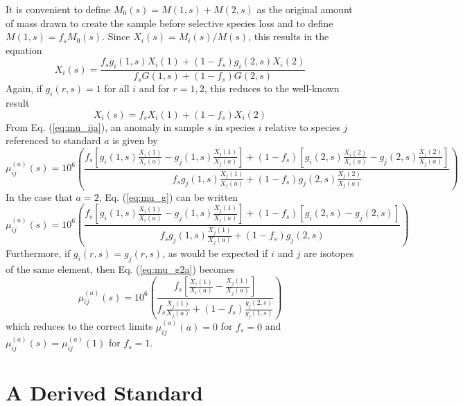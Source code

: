 \documentclass[preprint]{revtex4-2}
\begin{document}
It is convenient to define $M_0(s) = M(1, s) + M(2, s)$ as the original
amount of mass drawn to create the sample before selective species loss and
to define
$M(1, s) = f_s M_0(s)$.  Since
$X_i(s) = M_i(s) / M(s)$, this results in the equation
\begin{equation}
X_i(s) = \frac{f_s g_i(1, s) X_i(1) + \left(1 - f_s\right) g_i(2, s) X_i(2)}{f_s G(1, s) +
\left(1 - f_s\right) G(2, s)}
\label{eq:XG}
\end{equation}
Again, if $g_i(r, s) = 1$ for all $i$ and for $r = 1,2$,
this reduces to the well-known result
\begin{equation}
X_i(s) = f_s X_i(1) + \left(1 - f_s\right) X_i(2)
\label{eq:Xmix}
\end{equation}
From Eq. (\ref{eq:mu_ija}), an anomaly in sample $s$
in species $i$ relative to species
$j$ referenced to standard $a$ is given by
\begin{equation}
\mu_{ij}^{(a)}(s) =
10^6 \left(\frac{f_s \left[g_i(1, s) \frac{X_i(1)}{X_i(a)} -
g_j(1, s) \frac{X_j(1)}{X_j(a)}\right]
+
\left(1 - f_s\right) \left[g_i(2, s)\frac{X_i(2)}{X_i(a)}
- g_j(2, s)\frac{X_j(2)}{X_j(a)}\right]}
{f_s g_j(1, s) \frac{X_j(1)}{X_j(a)} +
\left(1 - f_s\right) g_j(2,s)\frac{X_j(2)}{X_j(a)}}\right)
\label{eq:mu_g}
\end{equation}
In the case that $a = 2$, Eq. (\ref{eq:mu_g}) can be written
\begin{equation}
\mu_{ij}^{(a)}(s) =
10^6 \left(\frac{f_s \left[g_i(1, s) \frac{X_i(1)}{X_i(a)} -
g_j(1, s) \frac{X_j(1)}{X_j(a)}\right]
+
\left(1 - f_s\right) \left[g_i(2, s) - g_j(2, s)\right]}
{f_s g_j(1, s) \frac{X_j(1)}{X_j(a)} + \left(1 - f_s\right) g_j(2,s)}\right)
\label{eq:mu_g2a}
\end{equation}
Furthermore,
if $g_i(r, s) = g_j(r, s)$, as would be expected if $i$ and $j$ are isotopes
of the same element, then Eq. (\ref{eq:mu_g2a}) becomes
\begin{equation}
\mu_{ij}^{(a)}(s) =
10^6 \left(\frac{f_s \left[\frac{X_i(1)}{X_i(a)} -
\frac{X_j(1)}{X_j(a)}\right]}
{f_s \frac{X_j(1)}{X_j(a)} + \left(1 - f_s\right) \frac{g_j(2,s)}{g_j(1, s)}}\right)
\label{eq:mu_g2a2}
\end{equation}
which reduces to the correct limits $\mu_{ij}^{(a)}(a) = 0$ for $f_s = 0$
and $\mu_{ij}^{(a)}(s) = \mu_{ij}^{(a)}(1)$ for $f_s = 1$.

\section{A Derived Standard}
\end{document}
